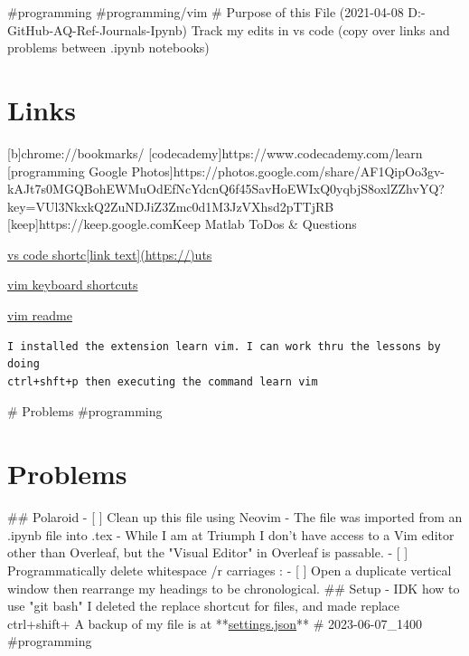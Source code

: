 #programming
#programming/vim
# Purpose of this File
(2021-04-08 D:-GitHub-AQ-Ref-Journals-Ipynb)
Track my edits in vs code (copy over links and problems between .ipynb notebooks)
\section{Links}
[b]{chrome://bookmarks/}
[codecademy]{https://www.codecademy.com/learn}
[programming Google Photos]{https://photos.google.com/share/AF1QipOo3gv-kAJt7s0MGQBohEWMuOdEfNcYdcnQ6f45SavHoEWIxQ0yqbjS8oxlZZhvYQ?key=VUl3NkxkQ2ZuNDJiZ3Zmc0d1M3JzVXhsd2pTTjRB}
[keep]{https://keep.google.com}{Keep Matlab} ToDos \& Questions

\href{https://code.visualstudio.com/docs/getstarted/keybindings\#_editorwindow-management}{vs
code shortc{[}link text{]}(https://)uts}

\href{https://vim.rtorr.com/}{vim keyboard shortcuts}

\href{https://github.com/VSCodeVim/Vim}{vim readme}

\begin{verbatim}
I installed the extension learn vim. I can work thru the lessons by doing 
ctrl+shft+p then executing the command learn vim
\end{verbatim}
# Problems
#programming
\section{Problems}\label{problems}
## Polaroid
- [ ] Clean up this file using Neovim
    - The file was imported from an .ipynb file into .tex
    - While I am at Triumph I don't have access to a Vim editor other than Overleaf, but the "Visual Editor" in Overleaf is passable.
    - [ ] Programmatically delete whitespace /r carriages :%
    - [ ] Open a duplicate vertical window then rearrange my headings to be chronological.
## Setup
- IDK how to use "git bash" I deleted the replace shortcut for files,
  and made replace ctrl+shift+
A backup of my file is at **\href{https://drive.google.com/file/d/1zdhAzUpru31W0oSY7ZKPXnwiqQ31veED/view?usp=sharing}{settings.json}**
# 2023-06-07_1400
#programming
